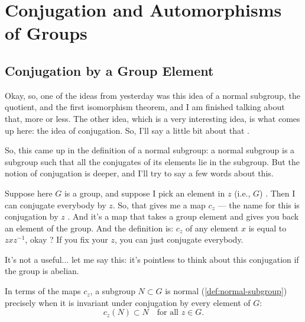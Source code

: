 \section{Conjugation and Automorphisms of Groups}

\subsection{Conjugation by a Group Element}

\begin{speech}[00:15:49 - 00:17:18]
Okay, so, one of the ideas from yesterday was this idea of a normal subgroup, the quotient, and the first isomorphism theorem, and I am finished talking about that, more or less. The other idea, which is a very interesting idea, is what comes up here: the idea of conjugation. So, I'll say a little bit about that .

So, this came up in the definition of a normal subgroup: a normal subgroup is a subgroup such that all the conjugates of its elements lie in the subgroup. But the notion of conjugation is deeper, and I'll try to say a few words about this.

Suppose here $G$ is a group, and suppose I pick an element in $z$ (i.e., $G$) . Then I can conjugate everybody by $z$. So, that gives me a map $c_z$ --- the name for this is conjugation by $z$ . And it's a map that takes a group element and gives you back an element of the group. And the definition is: $c_z$ of any element $x$ is equal to $z x z^{-1}$, okay ? If you fix your $z$, you can just conjugate everybody.

It's not a useful... let me say this: it's pointless to think about this conjugation if the group is abelian.
\end{speech}

\begin{content}

\begin{steps}
In terms of the maps $c_z$, a subgroup $N \subset G$ is normal (\cref{def:normal-subgroup}) precisely when it is invariant under conjugation by every element of $G$:
\[
c_z(N) \subset N \quad \text{for all } z \in G.
\]
\end{steps}
\end{content}

